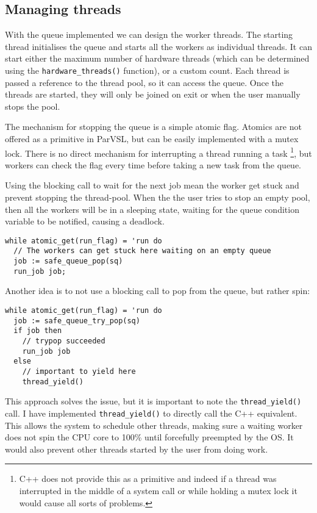 \subsection{Managing threads}
\label{ssec:managethreads}

With the queue implemented we can design the worker threads. The starting thread
initialises the queue and starts all the workers as individual threads. It can start
either the maximum number of hardware threads (which can be determined using the
\texttt{hardware\_threads()} function), or a custom count. Each thread is passed a reference to
the thread pool, so it can access the queue. Once the threads are started, they will only
be joined on exit or when the user manually stops the pool.

The mechanism for stopping the queue is a simple atomic flag. Atomics are not offered as
a primitive in ParVSL, but can be easily implemented with a mutex lock. There is no direct
mechanism for interrupting a thread running a task \footnote{C++ does not provide this as a
primitive and indeed if a thread was interrupted in the middle of a system call or while
holding a mutex lock it would cause all sorts of problems.}, but workers can check the flag every time
before taking a new task from the queue.

Using the blocking call to wait for the next job mean the worker get stuck and prevent
stopping the thread-pool. When the the user tries to stop an empty pool, then all
the workers will be in a sleeping state, waiting for the queue condition variable to be
notified, causing a deadlock.

\begin{verbatim}
while atomic_get(run_flag) = 'run do
  // The workers can get stuck here waiting on an empty queue
  job := safe_queue_pop(sq)
  run_job job;
\end{verbatim}

Another idea is to not use a blocking call to pop from the queue, but rather spin:
\begin{verbatim}
while atomic_get(run_flag) = 'run do
  job := safe_queue_try_pop(sq)
  if job then
    // trypop succeeded
    run_job job
  else
    // important to yield here
    thread_yield()
\end{verbatim}

This approach solves the issue, but it is important to note the \texttt{thread\_yield()} call.
I have implemented \texttt{thread\_yield()} to directly call the C++ equivalent. This allows the
system to schedule other threads, making sure a waiting worker does not spin the CPU
core to 100\% until forcefully preempted by the OS. It would also prevent other threads
started by the user from doing work.

